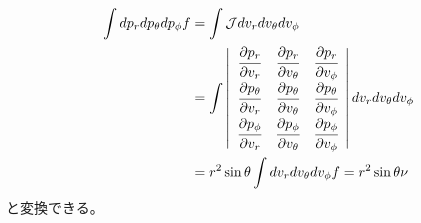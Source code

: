 \begin{align}
	\int dp_r dp_{\theta} dp_{\phi}f &= \int \mathcal{J} dv_r dv_{\theta} dv_{\phi}\\
	&=
	\int
	\left|
	\begin{array}{ccc}
	 	\cfrac{\partial p_r}{\partial v_r} & \cfrac{\partial p_r}{\partial v_{\theta}} & \cfrac{\partial p_r}{\partial v_{\phi}}\\
		\cfrac{\partial p_{\theta}}{\partial v_r} & \cfrac{\partial p_{\theta}}{\partial v_{\theta}} & \cfrac{\partial p_{\theta}}{\partial v_{\phi}}\\
		\cfrac{\partial p_{\phi}}{\partial v_r} & \cfrac{\partial p_{\phi}}{\partial v_{\theta}} & \cfrac{\partial p_{\phi}}{\partial v_{\phi}}
	\end{array}
	\right| 
	 dv_r dv_{\theta} dv_{\phi}\\
	&= r^2\sin\theta \int dv_r dv_{\theta} dv_{\phi}f = r^2 \sin\theta \nu    \label{integral}
\end{align}
と変換できる。

